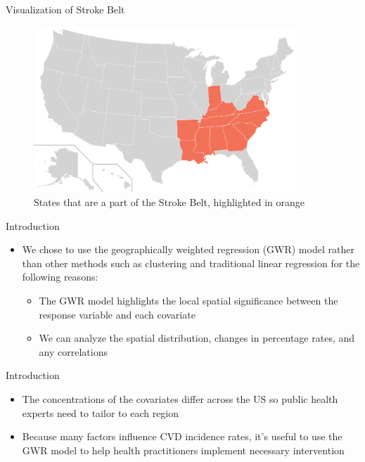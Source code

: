 \documentclass[
  ignorenonframetext,
]{beamer}
\providecommand{\tightlist}{%
  \setlength{\itemsep}{0pt}\setlength{\parskip}{0pt}}\usepackage{longtable,booktabs,array}
\begin{document}
\begin{frame}{Visualization of Stroke Belt}
\label{visualization-of-stroke-belt}
\begin{figure}[H]

{\centering \includegraphics[width=0.9\textwidth,height=\textheight]{PresentationPhotos/strokeBelt.png}

}

\caption{States that are a part of the Stroke Belt, highlighted in
orange}

\end{figure}%
\end{frame}

\begin{frame}{Introduction}
\label{introduction-2}
\begin{itemize}
\item
  We chose to use the geographically weighted regression (GWR) model
  rather than other methods such as clustering and traditional linear
  regression for the following reasons:~

  \begin{itemize}
  \item
    The GWR model highlights the local spatial significance between the
    response variable and each covariate~
  \item
    We can analyze the spatial distribution, changes in percentage
    rates, and any correlations
  \end{itemize}
\end{itemize}
\end{frame}

\begin{frame}{Introduction}
\label{introduction-3}
\begin{itemize}
\tightlist
\item
  The concentrations of the covariates differ across the US so public
  health experts need to tailor to each region~
\item
  Because many factors influence CVD incidence rates, it's useful to use
  the GWR model to help health practitioners implement necessary
  intervention
\end{itemize}
\end{frame}
\end{document}
